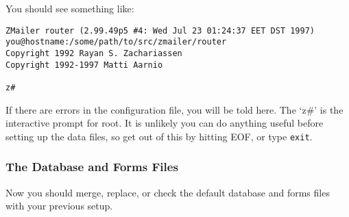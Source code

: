 You should see something like:
\begin{tscreen}
\begin{verbatim}
ZMailer router (2.99.49p5 #4: Wed Jul 23 01:24:37 EET DST 1997)
you@hostname:/some/path/to/src/zmailer/router
Copyright 1992 Rayan S. Zachariassen
Copyright 1992-1997 Matti Aarnio

z#    
\end{verbatim}
\end{tscreen}


If there are errors in the configuration file, you will be told here.
The `z\#' is the interactive prompt for root. It is unlikely you can do anything useful 
before setting up the data files, so get out of this by hitting EOF, or type {\tt exit}.




\subsubsection{The Database and Forms Files}

Now you should merge, replace, or check the default database and
forms files with your previous setup.


